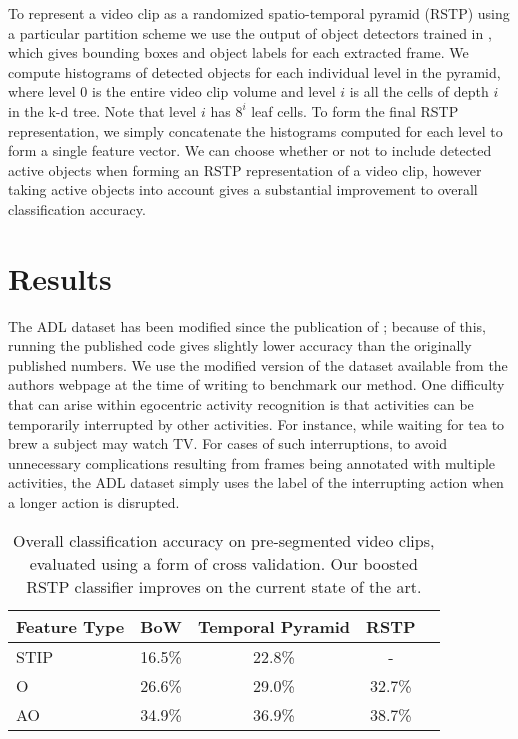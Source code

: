 \documentclass[10pt,twocolumn,letterpaper]{article}
\begin{document}
   To represent a video clip as a randomized spatio-temporal pyramid (RSTP)
   using a particular partition scheme we use the output of object detectors
   trained in \cite{Ramanan12}, which gives bounding boxes and object
   labels for each extracted frame. We compute histograms of detected
   objects for each individual level in the pyramid,
   where level 0 is the entire video clip volume and level $i$ is all the
   cells of depth $i$ in the k-d tree. 
   Note that level $i$ has $8^i$ leaf
   cells. To form the final RSTP representation, we simply concatenate the
   histograms computed for each level to form a single feature vector.
   We can choose whether or not to include detected active objects when
   forming an RSTP representation of a video clip, however taking active
   objects into account gives a substantial improvement to overall
   classification accuracy.
   


\section{Results}
	The ADL dataset has been modified since the publication of
	\cite{Ramanan12}; because of this, running the published code gives
	slightly lower accuracy than the originally published numbers. We use the
  modified version of the dataset available from the authors webpage at the time of writing to
  benchmark our method. One difficulty that can arise within egocentric
  activity recognition is that activities can be temporarily interrupted by
  other activities. For instance, while waiting for tea to brew a subject
  may watch TV. For cases of such interruptions, to avoid unnecessary
  complications resulting from frames being annotated with multiple
  activities, the ADL dataset simply uses the label of the interrupting
  action when a longer action is disrupted.
	
	\begin{table}
		\begin{center}
			\begin{tabular}{|l|c|c|c|c|}
				\hline
        Feature Type & BoW & Temporal Pyramid & RSTP \\
				\hline\hline
        STIP & 16.5\% & 22.8\% & - \\ 
        \hline
       O & 26.6\% & 29.0\% & 32.7\%\\
        \hline
      AO & 34.9\% & 36.9\% & 38.7\%\\
				\hline
			\end{tabular}
		\end{center}
		\caption{Overall classification accuracy on pre-segmented video clips,
    evaluated using a form of cross validation. Our boosted RSTP classifier
  improves on the current state of the art.}
	\end{table}
	
\end{document}
